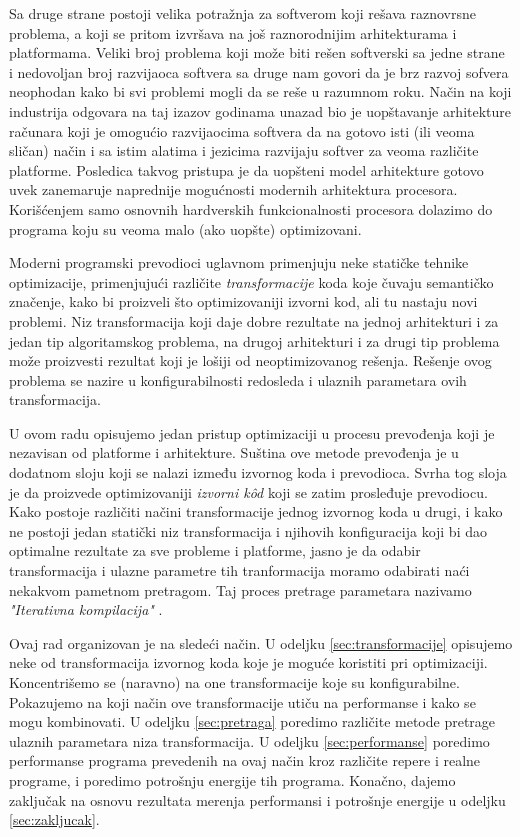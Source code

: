 \documentclass[a4paper]{article}
\begin{document}
{\par
Sa druge strane postoji velika potražnja za softverom koji rešava raznovrsne problema, a koji se pritom izvršava na još raznorodnijim arhitekturama i platformama.
Veliki broj problema koji može biti rešen softverski sa jedne strane i nedovoljan broj razvijaoca softvera sa druge nam govori da je brz razvoj sofvera neophodan kako bi svi problemi 
mogli da se reše u razumnom roku. Način na koji industrija odgovara na taj izazov godinama unazad bio je uopštavanje arhitekture računara koji je omogućio razvijaocima softvera 
da na gotovo isti (ili veoma sličan) način i sa istim alatima i jezicima razvijaju softver za veoma različite platforme. Posledica takvog pristupa je da uopšteni model arhitekture gotovo uvek zanemaruje 
naprednije mogućnosti modernih arhitektura procesora. Korišćenjem samo osnovnih hardverskih funkcionalnosti procesora dolazimo do programa koju su veoma malo (ako uopšte) optimizovani.

\par 
Moderni programski prevodioci uglavnom primenjuju neke statičke tehnike optimizacije, primenjujući različite 
\emph{transformacije} koda koje čuvaju semantičko značenje, kako bi proizveli što optimizovaniji izvorni kod, ali tu nastaju novi problemi. 
Niz transformacija koji daje dobre rezultate na jednoj arhitekturi i za jedan tip algoritamskog problema, 
na drugoj arhitekturi i za drugi tip problema može proizvesti rezultat koji je lošiji od neoptimizovanog rešenja.
Rešenje ovog problema se nazire u konfigurabilnosti redosleda i ulaznih parametara ovih transformacija.
\par
U ovom radu opisujemo jedan pristup optimizaciji u procesu prevođenja koji je nezavisan od platforme i arhitekture. 
Suština ove metode prevođenja je u dodatnom sloju koji se nalazi između izvornog koda i prevodioca. 
Svrha tog sloja je da proizvede optimizovaniji \emph{izvorni k\^{o}d} koji se zatim prosleđuje 
prevodiocu. Kako postoje različiti načini transformacije jednog izvornog koda u drugi, i kako ne postoji jedan statički niz transformacija i njihovih konfiguracija koji bi dao optimalne rezultate za sve probleme i platforme, 
jasno je da odabir transformacija i ulazne parametre tih tranformacija moramo odabirati naći nekakvom pametnom pretragom. 
Taj proces pretrage parametara nazivamo \emph{"Iterativna kompilacija"} \cite{kisuki2000iterative}.
\par
Ovaj rad organizovan je na sledeći način. 
U odeljku \ref{sec:transformacije} opisujemo neke od transformacija izvornog koda koje je moguće koristiti pri optimizaciji. 
Koncentrišemo se (naravno) na one transformacije koje su konfigurabilne. Pokazujemo na koji način ove transformacije utiču na performanse i kako se mogu kombinovati. 
U odeljku \ref{sec:pretraga} poredimo različite metode pretrage ulaznih parametara niza transformacija.
U odeljku \ref{sec:performanse} poredimo performanse programa prevedenih na ovaj način kroz različite repere i realne programe, i poredimo potrošnju energije tih programa.
Konačno, dajemo zaključak na osnovu rezultata merenja performansi i potrošnje energije u odeljku \ref{sec:zakljucak}.


}
\end{document}

